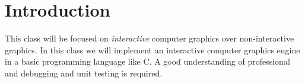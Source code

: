\section{Introduction}

This class will be focused on \emph{interactive} computer graphics over
non-interactive graphics. In this class we will implement an interactive
computer graphics engine in a basic programming language like C. A good
understanding of professional and debugging and unit testing is required.
